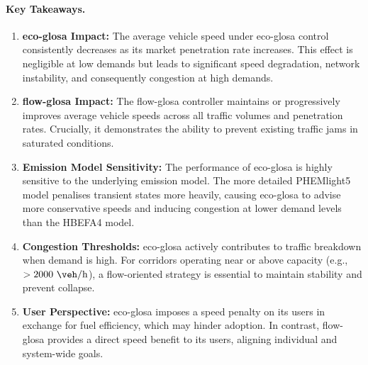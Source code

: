 \paragraph{Key Takeaways.}
\begin{enumerate}
    \item \textbf{\ac{eco-glosa} Impact:} The average vehicle speed under \ac{eco-glosa} control consistently decreases as its market penetration rate increases. This effect is negligible at low demands but leads to significant speed degradation, network instability, and consequently congestion at high demands.
    \item \textbf{\ac{flow-glosa} Impact:} The \ac{flow-glosa} controller maintains or progressively improves average vehicle speeds across all traffic volumes and penetration rates. Crucially, it demonstrates the ability to prevent existing traffic jams in saturated conditions.
    \item \textbf{Emission Model Sensitivity:} The performance of \ac{eco-glosa} is highly sensitive to the underlying emission model. The more detailed PHEMlight5 model penalises transient states more heavily, causing \ac{eco-glosa} to advise more conservative speeds and inducing congestion at lower demand levels than the HBEFA4 model.
    \item \textbf{Congestion Thresholds:} \ac{eco-glosa} actively contributes to traffic breakdown when demand is high. For corridors operating near or above capacity (e.g., $> 2000~\unit{\veh\per\hour}$), a flow-oriented strategy is essential to maintain stability and prevent collapse.
    \item \textbf{User Perspective:} \ac{eco-glosa} imposes a speed penalty on its users in exchange for fuel efficiency, which may hinder adoption. In contrast, \ac{flow-glosa} provides a direct speed benefit to its users, aligning individual and system-wide goals.
\end{enumerate}


